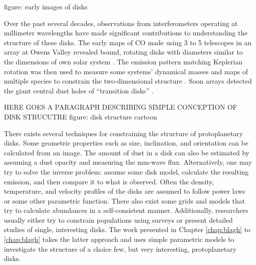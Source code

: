 figure: early images of disks

Over the past several decades, observations from interferometers operating at millimeter wavelengths have made
significant contributions to understanding the structure of these disks.  The early maps of CO made using 3 to 5 
telescopes in an array at 
Owens Valley revealed bound, rotating disks with diameters 
similar to the dimensions of own solar system 
\citep{sargent87,weintraub87,weintraub89,sargent91,koerner93a,koerner93b,koerner95}.  The emission pattern
matching Keplerian 
rotation was then used to measure some systems' dynamical masses 
\citep{dutrey98,guilloteau98,guilloteau99,simon00} and
maps of multiple species to constrain the two-dimensional structure 
\citep{aikawa99,aikawa01,vanzadelhoff01,aikawa02}.   Soon arrays detected the giant central dust holes of 
``transition disks''
\citep{hughes07,brown09,andrews11}.

HERE GOES A PARAGRAPH DESCRIBING SIMPLE CONCEPTION OF DISK STRUCUTRE
figure: disk structure cartoon

There exists several techniques for constraining the structure of protoplanetary disks.  Some geometric 
properties such as size, inclination, and orientation can be calculated from an image.  The amount of dust 
in a disk can also be estimated by assuming a dust opacity and measuring the mm-wave flux.  Alternatively, one 
may try to solve the inverse problem: assume some disk model, calculate the resulting emission, and then compare
it to what is observed.  Often the density, temperature, and velocity profiles of the disks are assumed to 
follow power laws or some other parametric function.  There also exist some grids and models that try to 
calculate abundances in a self-consistent manner.  Additionally, researchers usually either try to constrain 
populations using 
surveys \citep[i.e.][]{andrews11,harris14} or present detailed studies of single, interesting disks.  The work
presented in Chapter \ref{chap:blagh} to \ref{chap:blagh} takes the latter approach and uses simple parametric 
models to investigate the structure of a choice few, but very interesting, protoplanetary disks.

